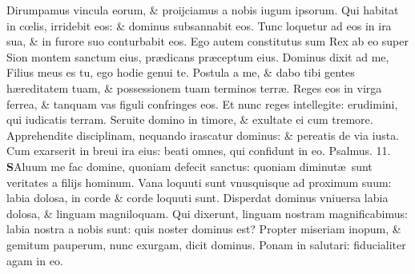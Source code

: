 \documentclass[a5paper,10pt]{book}
\def\ae{æ}
\def\oe{œ}
\begin{document}
\begin{multicols*}{2}
\newline \color{red} D\color{black}irumpamus vincula eorum, \& proijciamus a nobis iugum ipsorum.
\newline \color{red} Q\color{black}ui habitat in c\oe lis, irridebit eos: \& dominus subsannabit eos.
\newline \color{red} T\color{black}unc loquetur ad eos in ira sua, \& in furore suo conturbabit eos.
\newline \color{red} E\color{black}go autem constitutus sum Rex ab eo super Sion montem sanctum eius, pr\ae dicans pr\ae ceptum eius.
\newline \color{red} D\color{black}ominus dixit ad me, Filius meus es tu, ego hodie genui te.
\newline \color{red} P\color{black}ostula a me, \& dabo tibi gentes h\ae reditatem tuam, \& possessionem tuam terminos terr\ae .
\newline \color{red} R\color{black}eges eos in virga ferrea, \& tanquam vas figuli confringes eos.
\newline \color{red} E\color{black}t nunc reges intellegite: erudimini, qui iudicatis terram.
\newline \color{red} S\color{black}eruite domino in timore, \& exultate ei cum tremore.
\newline \color{red} A\color{black}pprehendite disciplinam, nequando irascatur dominus: \& pereatis de via iusta.
\newline \color{red} C\color{black}um exarserit in breui ira eius: beati omnes, qui confidunt in eo.
\newline \color{red} Psalmus. \hypertarget{ps11}{11.} \color{black}
\vspace{-.25em}
\lettrine[lines=2]{\bfseries \color{red} S}{}Aluum me fac domine, quoniam defecit sanctus: quoniam diminut\ae \ sunt veritates a filijs hominum.
\newline \color{red} V\color{black}ana loquuti sunt vnusquisque ad proximum suum: labia dolosa, in corde \& corde loquuti sunt.
\newline \color{red} D\color{black}isperdat dominus vniuersa labia dolosa, \& linguam magniloquam.
\newline \color{red} Q\color{black}ui dixerunt, linguam nostram magnificabimus: labia nostra a nobis sunt: quis noster dominus est?
\newline \color{red} P\color{black}ropter miseriam inopum, \& gemitum pauperum, nunc exurgam, dicit dominus.
\newline \color{red} P\color{black}onam in salutari: fiducialiter agam in eo.

\end{multicols*}
\end{document}
